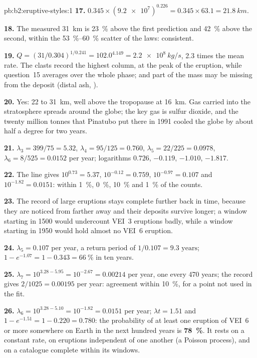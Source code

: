 \begin{solution}{pb:b2:eruptive-styles:1}
\textbf{17.} $0.345\times(\num{9.2e7})^{0.226} = 0.345\times63.1 = \qty{21.8}{km}$.

\textbf{18.} The measured \qty{31}{km} is \qty{23}{\percent} above the first
prediction and \qty{42}{\percent} above the second, within the
\qtyrange{53}{60}{\percent} scatter of the laws: consistent.

\textbf{19.} $Q = (31/0.304)^{1/0.241} = 102.0^{4.149} = \qty{2.2e8}{kg/s}$, 2.3 times
the mean rate. The clasts record the highest column, at the peak of the
eruption, while question~15 averages over the whole phase; and part of the mass
may be missing from the deposit (distal ash, ).

\textbf{20.} Yes: 22 to \qty{31}{km}, well above the tropopause at \qty{16}{km}.
Gas carried into the stratosphere spreads around the globe; the key gas is
sulfur dioxide, and the twenty million tonnes that Pinatubo put there in 1991
cooled the globe by about half a degree for two years.

\textbf{21.} $\lambda_3 = 399/75 = 5.32$, $\lambda_4 = 95/125 = 0.760$, $\lambda_5 = 22/225 =
0.0978$, $\lambda_6 = 8/525 = 0.0152$ per year; logarithms $0.726$, $-0.119$, $-1.010$,
$-1.817$.

\textbf{22.} The line gives $10^{0.73} = 5.37$, $10^{-0.12} = 0.759$, $10^{-0.97} =
0.107$ and $10^{-1.82} = 0.0151$: within \qty{1}{\percent}, \qty{0}{\percent},
\qty{10}{\percent} and \qty{1}{\percent} of the counts.

\textbf{23.} The record of large eruptions stays complete further back in time,
because they are noticed from farther away and their deposits survive longer; a
window starting in 1500 would undercount VEI~3 eruptions badly, while a window
starting in 1950 would hold almost no VEI~6 eruption.

\textbf{24.} $\lambda_5 = \num{0.107}$ per year, a return period of $1/0.107 =
\num{9.3}\text{ years}$; $1 - e^{-1.07} = 1 - 0.343 = \qty{66}{\percent}$ in ten years.

\textbf{25.} $\lambda_7 = 10^{3.28 - 5.95} = 10^{-2.67} = 0.00214$ per year, one every
470 years; the record gives $2/1025 = 0.00195$ per year: agreement within
\qty{10}{\percent}, for a point not used in the fit.

\textbf{26.} $\lambda_6 = 10^{3.28 - 5.10} = 10^{-1.82} = 0.0151$ per year; $\lambda t = 1.51$
and $1 - e^{-1.51} = 1 - 0.220 = 0.780$: the probability of at least one eruption
of VEI~6 or more somewhere on Earth in the next hundred years is
\textbf{\qty[text-series-to-math=true]{78}{\percent}}. It rests on a constant rate,
on eruptions independent of one another (a Poisson process), and on a
catalogue complete within its windows.
\end{solution}
